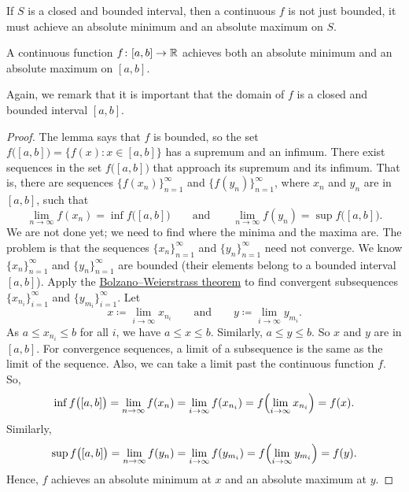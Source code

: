 If $S$ is a closed
and bounded interval, then a continuous $f$
is not just bounded, it must achieve an absolute minimum and an absolute
maximum on $S$.

\begin{thm}
%
%
%
A continuous function $f \colon [a,b] \to {\mathbb{R}}$
achieves both an absolute minimum and an absolute maximum on $[a,b]$.
\end{thm}

Again, we remark that it is important that the domain of $f$ is a closed and bounded interval $[a,b]$.

\begin{proof}
The lemma says that $f$ is bounded, so
the set $f\bigl([a,b]\bigr) = \bigl\{ f(x) : x \in [a,b] \bigr\}$ has a supremum and an infimum.
There exist sequences
in the set $f\bigl([a,b]\bigr)$ that approach its supremum and its infimum.
That is, there are sequences
$\bigl\{ f(x_n) \bigr\}_{n=1}^\infty$ and $\bigl\{ f(y_n)
\bigr\}_{n=1}^\infty$, where $x_n$ and $y_n$ are in $[a,b]$,
such that
\begin{equation*}
\lim_{n\to\infty} f(x_n) = \inf f\bigl([a,b]\bigr) \qquad \text{and} \qquad
\lim_{n\to\infty} f(y_n) = \sup f\bigl([a,b]\bigr).
\end{equation*}
We are not done yet; we need to find where the minima and the maxima are.
The problem is that the sequences $\{ x_n \}_{n=1}^\infty$ and
$\{ y_n \}_{n=1}^\infty$ need not converge.
We know $\{ x_n \}_{n=1}^\infty$ and $\{ y_n \}_{n=1}^\infty$ are bounded
(their elements belong to a bounded interval $[a,b]$).
Apply the 
\hyperref[thm:bwseq]{Bolzano--Weierstrass theorem}
to find
convergent subsequences
$\{ x_{n_i} \}_{i=1}^\infty$ and 
$\{ y_{m_i} \}_{i=1}^\infty$.  Let
\begin{equation*}
x \coloneqq \lim_{i\to\infty} x_{n_i}
\qquad \text{and} \qquad
y \coloneqq \lim_{i\to\infty} y_{m_i}.
\end{equation*}
As $a \leq x_{n_i} \leq b$ for all $i$, we have $a \leq x \leq b$.
Similarly, $a \leq y \leq b$.  So $x$ and $y$ are in $[a,b]$.
For convergence sequences,
a limit of a subsequence is the same as the limit of the
sequence.  Also, we can take a limit past the continuous function $f$.  So,
\begin{equation*}
\inf f\bigl([a,b]\bigr) = \lim_{n\to\infty} f(x_n)
= \lim_{i\to\infty} f(x_{n_i}) = 
f \Bigl( \lim_{i\to\infty} x_{n_i} \Bigr) = f(x) .
\end{equation*}
Similarly,
\begin{equation*}
\sup f\bigl([a,b]\bigr) = \lim_{n\to\infty} f(y_n)
= \lim_{i\to\infty} f(y_{m_i}) = 
f \Bigl( \lim_{i\to\infty} y_{m_i} \Bigr) = f(y) .
\end{equation*}
Hence, $f$ achieves an absolute minimum at $x$ and
an absolute maximum at $y$.
\end{proof}

